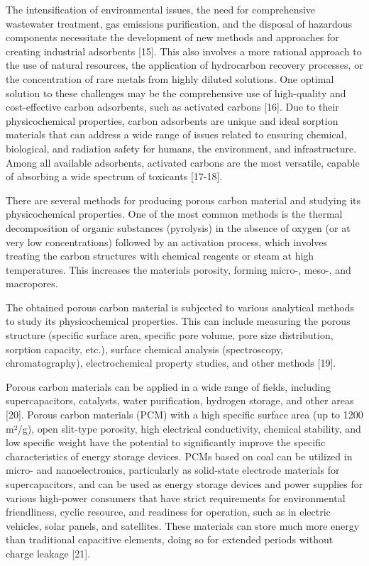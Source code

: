 The intensification of environmental issues, the need for comprehensive
wastewater treatment, gas emissions purification, and the disposal of
hazardous components necessitate the development of new methods and
approaches for creating industrial adsorbents {[}15{]}. This also
involves a more rational approach to the use of natural resources, the
application of hydrocarbon recovery processes, or the concentration of
rare metals from highly diluted solutions. One optimal solution to these
challenges may be the comprehensive use of high-quality and
cost-effective carbon adsorbents, such as activated carbons {[}16{]}.
Due to their physicochemical properties, carbon adsorbents are unique
and ideal sorption materials that can address a wide range of issues
related to ensuring chemical, biological, and radiation safety for
humans, the environment, and infrastructure. Among all available
adsorbents, activated carbons are the most versatile, capable of
absorbing a wide spectrum of toxicants {[}17-18{]}.

There are several methods for producing porous carbon material and
studying its physicochemical properties. One of the most common methods
is the thermal decomposition of organic substances (pyrolysis) in the
absence of oxygen (or at very low concentrations) followed by an
activation process, which involves treating the carbon structures with
chemical reagents or steam at high temperatures. This increases the
material\textquotesingle s porosity, forming micro-, meso-, and
macropores.

The obtained porous carbon material is subjected to various analytical
methods to study its physicochemical properties. This can include
measuring the porous structure (specific surface area, specific pore
volume, pore size distribution, sorption capacity, etc.), surface
chemical analysis (spectroscopy, chromatography), electrochemical
property studies, and other methods {[}19{]}.

Porous carbon materials can be applied in a wide range of fields,
including supercapacitors, catalysts, water purification, hydrogen
storage, and other areas {[}20{]}. Porous carbon materials (PCM) with a
high specific surface area (up to 1200 m²/g), open slit-type porosity,
high electrical conductivity, chemical stability, and low specific
weight have the potential to significantly improve the specific
characteristics of energy storage devices. PCMs based on coal can be
utilized in micro- and nanoelectronics, particularly as solid-state
electrode materials for supercapacitors, and can be used as energy
storage devices and power supplies for various high-power consumers that
have strict requirements for environmental friendliness, cyclic
resource, and readiness for operation, such as in electric vehicles,
solar panels, and satellites. These materials can store much more energy
than traditional capacitive elements, doing so for extended periods
without charge leakage {[}21{]}.

